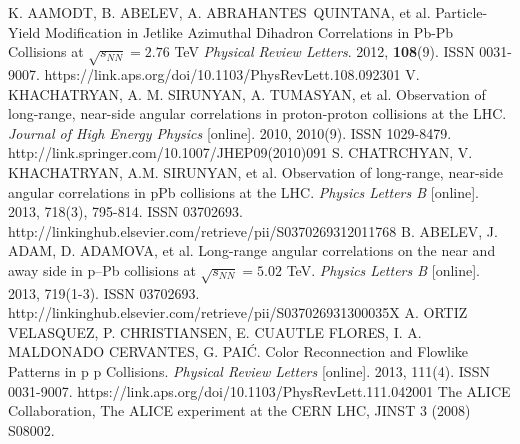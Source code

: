 \documentclass[thesismargins, thesislinespacing]{rnthesis}
\begin{document}
\begin{thebibliography}{}
K. AAMODT, B. ABELEV, A. ABRAHANTES QUINTANA, et al. Particle-Yield Modification in Jetlike Azimuthal Dihadron Correlations in Pb-Pb Collisions at $\sqrt{s_{NN}} = 2.76$ TeV \textit{Physical Review Letters}. 2012, \textbf{108}(9). ISSN 0031-9007. https://link.aps.org/doi/10.1103/PhysRevLett.108.092301
V. KHACHATRYAN, A. M. SIRUNYAN, A. TUMASYAN, et al. Observation of long-range, near-side angular correlations in proton-proton collisions at the LHC. \textit{Journal of High Energy Physics} [online]. 2010, 2010(9). ISSN 1029-8479. http://link.springer.com/10.1007/JHEP09(2010)091
S. CHATRCHYAN, V. KHACHATRYAN, A.M. SIRUNYAN, et al. Observation of long-range, near-side angular correlations in pPb collisions at the LHC. \textit{Physics Letters B} [online]. 2013, 718(3), 795-814. ISSN 03702693. http://linkinghub.elsevier.com/retrieve/pii/S0370269312011768
B. ABELEV, J. ADAM, D. ADAMOVA, et al. Long-range angular correlations on the near and away side in p–Pb collisions at $\sqrt{s_{NN}}=5.02$ TeV. \textit{Physics Letters B} [online]. 2013, 719(1-3). ISSN 03702693. http://linkinghub.elsevier.com/retrieve/pii/S037026931300035X
A. ORTIZ VELASQUEZ, P. CHRISTIANSEN, E. CUAUTLE FLORES, I. A. MALDONADO CERVANTES, G. PAIĆ. Color Reconnection and Flowlike Patterns in p p Collisions. \textit{Physical Review Letters} [online]. 2013, 111(4). ISSN 0031-9007. https://link.aps.org/doi/10.1103/PhysRevLett.111.042001
The ALICE Collaboration, The ALICE experiment at the CERN LHC, JINST 3 (2008) S08002.


\end{thebibliography}
\end{document}
